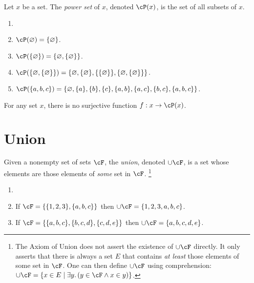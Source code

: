 \documentclass{amsart}
\begin{document}
\begin{defn}
  Let $x$ be a set.
  The \emph{power set} of $x$, denoted $\cP(x)$, is the set of all subsets of $x$.
\end{defn}


\begin{eg}\label{eg:subsets}
  \begin{enumerate}
  \item[]
  \item $\cP(\varnothing) = \{\varnothing\}$.
  \item $\cP(\{ \varnothing \}) = \{\varnothing, \{\varnothing\}\}$.
  \item $\cP(\{\varnothing, \{\varnothing\}\}) = \{ \varnothing, \{\varnothing\}, \{\{\varnothing\}\}, \{\varnothing, \{\varnothing\}\} \}$.
  \item $\cP(\{ a,b,c \}) = \{ \varnothing, \{ a \}, \{ b \}, \{ c \}, \{ a,b \}, \{ a,c \}, \{ b,c \}, \{ a,b,c \} \}$.
  \end{enumerate}
\end{eg}

\begin{thm}
  For any set $x$, there is no surjective function $f : x \to \cP(x)$.
\end{thm}

\section{Union}
\label{sec:union}

\begin{defn}
  Given a nonempty set of sets $\cF$, the \emph{union}, denoted $\cup\cF$, is a set whose elements are those elements of \emph{some} set in $\cF$.
  \footnote{The Axiom of Union does not assert the existence of $\cup\cF$ directly.
    It only asserts that there is always a set $E$ that contains \emph{at least} those elements of some set in $\cF$.
    One can then define $\cup\cF$ using comprehension: $\cup\cF = \{ x \in E \mid \exists y.\,(y \in \cF \wedge x \in y) \}$.
  }
\end{defn}

\begin{eg}
  \begin{enumerate}
  \item[]
  \item If $\cF = \{\{1,2,3\},\{a,b,c\}\}$ then $\cup\cF = \{1,2,3,a,b,c\}$.
  \item If $\cF = \{\{a,b,c\},\{b,c,d\},\{c,d,e\}\}$ then $\cup\cF = \{a,b,c,d,e\}$.
  \end{enumerate}
\end{eg}
\end{document}
